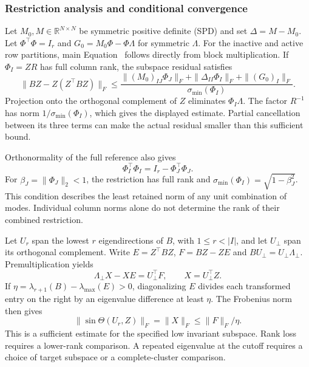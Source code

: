 \subsubsection{Restriction analysis and conditional convergence}
\label{si:theory}
Let $M_0,M\in\mathbb R^{N\times N}$ be symmetric positive definite (SPD)
and set $\Delta=M-M_0$.
Let $\Phi^\top\Phi=I_r$ and
$G_0=M_0\Phi-\Phi\Lambda$ for symmetric $\Lambda$.
For the inactive and active row partitions, main
Equation~ follows directly from
block multiplication. If $\Phi_I=ZR$ has full column rank, the
subspace residual satisfies
\begin{equation}\label{eq:si_F_bound}
 \|BZ-Z(Z^\top BZ)\|_F
 \leq\frac{
 \|(M_0)_{IJ}\Phi_J\|_F+
 \|\Delta_{II}\Phi_I\|_F+
 \|(G_0)_I\|_F}{\sigma_{\min}(\Phi_I)}.
\end{equation}
Projection onto the orthogonal complement of $Z$ eliminates
$\Phi_I\Lambda$. The factor $R^{-1}$ has norm
$1/\sigma_{\min}(\Phi_I)$, which gives the displayed estimate.
Partial cancellation between its three terms can make the
actual residual smaller than this sufficient bound.

Orthonormality of the full reference also gives
\begin{equation}\label{eq:si_massloss}
 \Phi_I^\top\Phi_I=I_r-\Phi_J^\top\Phi_J.
\end{equation}
For $\beta_J=\|\Phi_J\|_2<1$, the restriction has full rank and
$\sigma_{\min}(\Phi_I)=\sqrt{1-\beta_J^2}$. This condition describes
the least retained norm of any unit combination of modes. Individual
column norms alone do not determine the rank of their combined
restriction.

Let $U_r$ span the lowest $r$ eigendirections of $B$, with
$1\leq r<|I|$, and let $U_\perp$ span its orthogonal complement.
Write $E=Z^\top BZ$, $F=BZ-ZE$ and
$BU_\perp=U_\perp\Lambda_\perp$. Premultiplication yields
\begin{equation}\label{eq:si_sylvester}
 \Lambda_\perp X-XE=U_\perp^\top F,\qquad X=U_\perp^\top Z.
\end{equation}
If $\eta=\lambda_{r+1}(B)-\lambda_{\max}(E)>0$, diagonalizing $E$
divides each transformed entry on the right by an eigenvalue
difference at least $\eta$. The Frobenius norm then gives
\[
 \|\sin\Theta(U_r,Z)\|_F=\|X\|_F\leq\|F\|_F/\eta.
\]
This is a sufficient estimate for the specified low invariant
subspace. Rank loss requires a lower-rank comparison. A repeated
eigenvalue at the cutoff requires a choice of target subspace or
a complete-cluster comparison.

